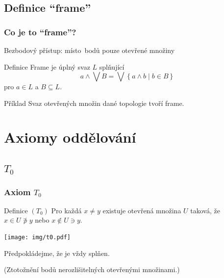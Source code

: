 \documentclass[mathserif]{beamer}
\begin{document}

\subsection{Definice ``frame''}

\begin{frame}
\frametitle{Co je to ``frame''?}
Bezbodový přístup: místo~bodů pouze \alert{otevřené množiny}
\pause

\begin{block}{Definice}
  {\color{blue}Frame} je úplný svaz $L$ splňující
  \begin{equation*}%
    a \wedge \bigvee B
    = \bigvee \left\{ a \wedge b \mid b \in B \right\}
  \end{equation*}
  pro $a \in L$ a $B \subseteq L$.
\end{block}
\pause

\begin{exampleblock}{Příklad}
  Svaz otevřených množin dané topologie tvoří frame.
\end{exampleblock}
\end{frame}

\section{Axiomy oddělování}

\subsection{$T_0$} %

\begin{frame}
\frametitle{Axiom $T_0$}

\begin{block}{Definice $(T_0)$}
  Pro každá $x \ne y$ existuje otevřená množina $U$ taková, že $x \in U
  \not\owns y$ nebo $x \not\in U \ni y$.
\end{block}

\begin{center}
  \texttt{[image: img/t0.pdf]}
\end{center}
\pause

Předpokládejme, že je \alert{vždy splňen}.

(Ztotožnění bodů nerozlišitelných otevřenými množinami.)

\end{frame}
\end{document}
